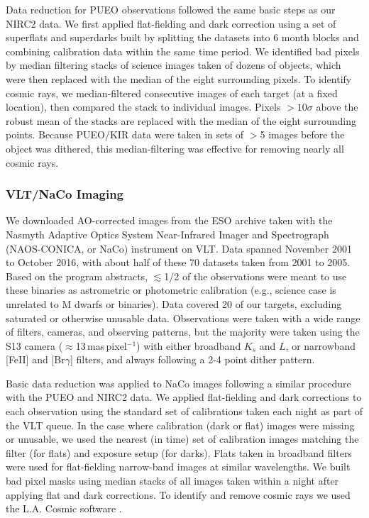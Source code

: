 \documentclass[twocolumn]{aastex62}
\begin{document}
Data reduction for PUEO observations followed the same basic steps as our NIRC2 data. We first applied flat-fielding and dark correction using a set of superflats and superdarks built by splitting the datasets into 6 month blocks and combining calibration data within the same time period. We identified bad pixels by median filtering stacks of science images taken of dozens of objects, which were then replaced with the median of the eight surrounding pixels. To identify cosmic rays, we median-filtered consecutive images of each target (at a fixed location), then compared the stack to individual images. Pixels $>10\sigma$ above the robust mean of the stacks are replaced with the median of the eight surrounding points. Because PUEO/KIR data were taken in sets of $>$5 images before the object was dithered, this median-filtering was effective for removing nearly all cosmic rays.


\subsubsection{VLT/NaCo Imaging}

We downloaded AO-corrected images from the ESO archive taken with the Nasmyth Adaptive Optics System Near-Infrared Imager and Spectrograph (NAOS-CONICA, or NaCo) instrument on VLT. Data spanned November 2001 to October 2016, with about half of these 70 datasets taken from 2001 to 2005. Based on the program abstracts, $\lesssim$1/2 of the observations were meant to use these binaries as astrometric or photometric calibration (e.g., science case is unrelated to M dwarfs or binaries). Data covered 20 of our targets, excluding saturated or otherwise unusable data. Observations were taken with a wide range of filters, cameras, and observing patterns, but the majority were taken using the S13 camera ($\approx$13\,mas\,pixel$^{-1}$) with either broadband $K_s$ and $L$, or narrowband [FeII] and [Br$\gamma$] filters, and always following a 2-4 point dither pattern. 

Basic data reduction was applied to NaCo images following a similar procedure with the PUEO and NIRC2 data. We applied flat-fielding and dark corrections to each observation using the standard set of calibrations taken each night as part of the VLT queue. In the case where calibration (dark or flat) images were missing or unusable, we used the nearest (in time) set of calibration images matching the filter (for flats) and exposure setup (for darks). Flats taken in broadband filters were used for flat-fielding narrow-band images at similar wavelengths. We built bad pixel masks using median stacks of all images taken within a night after applying flat and dark corrections. To identify and remove cosmic rays we used the L.A. Cosmic software \citep{2001PASP..113.1420V}.
\end{document}
